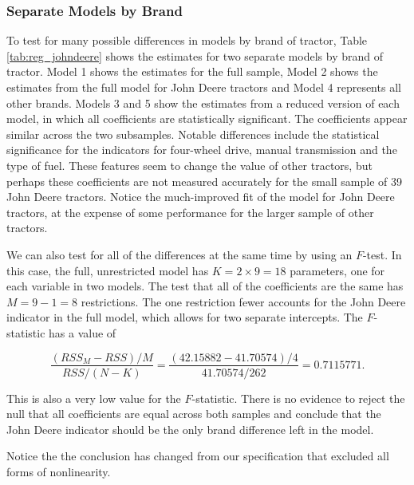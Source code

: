 \documentclass[11pt]{paper}
\begin{document}


\clearpage
\pagebreak
\subsubsection{Separate Models by Brand}


To test for many possible differences in 
models by brand of tractor, 
Table \ref{tab:reg_johndeere}
shows the estimates for two separate models
by brand of tractor.
%
Model 1 shows the estimates for 
the full sample,
Model 2 shows the estimates from the full model for 
John Deere tractors
and Model 4 
represents all other brands. 
% 
Models 3 and 5 show the estimates from a reduced version of each model, 
in which all coefficients are statistically significant. 
% 
The coefficients appear similar across the two subsamples.
Notable differences include the statistical significance for 
the indicators for four-wheel drive, 
manual transmission and the type of fuel. 
These features seem to change the value of 
other tractors, but perhaps these coefficients are not measured 
accurately for the small sample of 39 
John Deere tractors. 
Notice the much-improved fit of the model for John Deere tractors, 
at the expense of some performance for the larger sample
of other tractors.





We can also test for all of the differences at the same time
by using an $F$-test. 
In this case, the full, unrestricted model has $K = 2\times9 = 18$ parameters, one for each variable in two models. 
The test that all of the coefficients are the same has $M = 9 - 1 = 8$
restrictions. 
The one restriction fewer accounts for the John Deere indicator
in the full model, 
which allows for two separate intercepts. 
% 
The $F$-statistic has a value of 

$$ 
\frac{(RSS_M - RSS)/M}{RSS/(N - K)} = \frac{(42.15882 - 41.70574)/4}{41.70574/262} = 0.7115771. 
$$

This is also a very low value for the $F$-statistic. 
There is no evidence to reject the null that all 
coefficients are equal across both samples 
and conclude that the John Deere indicator
should be the only brand difference left in the model. 

Notice the the conclusion has changed from our specification
that excluded all forms of nonlinearity.

\end{document}
